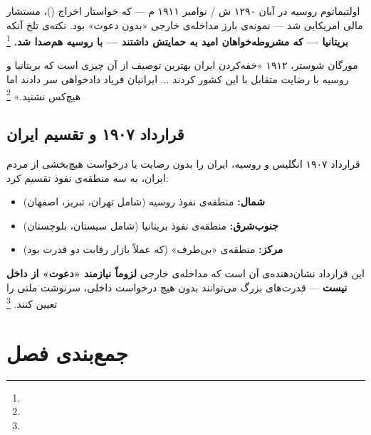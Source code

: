 اولتیماتوم روسیه در آبان ۱۲۹۰ ش / نوامبر ۱۹۱۱ م — که خواستار اخراج  ()، مستشار مالی امریکایی شد — نمونه‌ی بارز مداخله‌ی خارجی «بدون دعوت» بود. نکته‌ی تلخ آنکه \textbf{بریتانیا — که مشروطه‌خواهان امید به حمایتش داشتند — با روسیه هم‌صدا شد.}%
\footnote{}

\begin{histQuote}{مورگان شوستر، ۱۹۱۲}
«خفه‌کردن ایران بهترین توصیف از آن چیزی است که بریتانیا و روسیه با رضایت متقابل با این کشور کردند ... ایرانیان فریاد دادخواهی سر دادند اما هیچ‌کس نشنید.»%
\footnote{}
\end{histQuote}

\subsection{قرارداد ۱۹۰۷ و تقسیم ایران}
\label{subsec:ch06-1907}

\begin{tcolorbox}[enemybox, title={قرارداد ۱۹۰۷: تقسیم ایران بدون نجات‌طلبی}]
قرارداد ۱۹۰۷ انگلیس و روسیه، ایران را بدون رضایت یا درخواست هیچ‌بخشی از مردم ایران، به سه منطقه‌ی نفوذ تقسیم کرد:
\begin{itemize}[nosep, rightmargin=1em]
  \item \textbf{شمال:} منطقه‌ی نفوذ روسیه (شامل تهران، تبریز، اصفهان)
  \item \textbf{جنوب‌شرق:} منطقه‌ی نفوذ بریتانیا (شامل سیستان، بلوچستان)
  \item \textbf{مرکز:} منطقه‌ی «بی‌طرف» (که عملاً بازار رقابت دو قدرت بود)
\end{itemize}

این قرارداد نشان‌دهنده‌ی آن است که مداخله‌ی خارجی \textbf{لزوماً نیازمند «دعوت» از داخل نیست} — قدرت‌های بزرگ می‌توانند بدون هیچ درخواست داخلی، سرنوشت ملتی را تعیین کنند.%
\footnote{}
\end{tcolorbox}

\section{جمع‌بندی فصل}
\label{sec:ch06-summary}

